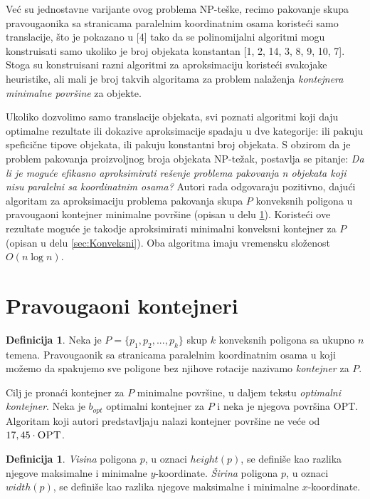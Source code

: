 \documentclass[a4paper]{article}
\theoremstyle{plain}
\theoremstyle{definition}
\newtheorem{defn}[thm]{Definicija} %
\begin{document}
Ve\'c{} su jednostavne varijante ovog problema NP-te\v{s}ke, recimo pakovanje skupa pravougaonika sa stranicama paralelnim koordinatnim osama koriste\'c{}i samo translacije, \v{s}to je pokazano u \cite{paper} [4] tako da se polinomijalni algoritmi mogu konstruisati samo ukoliko je broj objekata konstantan \cite{paper} [1, 2, 14, 3, 8, 9, 10, 7]. Stoga su konstruisani razni algoritmi za aproksimaciju koriste\'c{}i svakojake heuristike, ali mali je broj takvih algoritama za problem nala\v{z}enja \emph{kontejnera minimalne povr\v{s}ine} za objekte. 

Ukoliko dozvolimo samo translacije objekata, svi poznati algoritmi koji daju optimalne rezultate ili dokazive aproksimacije spadaju u dve kategorije: ili pakuju spefici\v{c}ne tipove objekata, ili pakuju konstantni broj objekata. S obzirom da je problem pakovanja proizvoljnog broja objekata NP-te\v{z}ak, postavlja se pitanje: \emph{Da li je mogu\'c{}e efikasno aproksimirati re\v{s}enje problema pakovanja n objekata koji nisu paralelni sa koordinatnim osama?} Autori rada odgovaraju pozitivno, daju\'c{}i algoritam za aproksimaciju problema pakovanja skupa $P$ konveksnih poligona u pravougaoni kontejner minimalne povr\v{s}ine (opisan u delu \ref{sec:Pravougaoni}). Koriste\'c{}i ove rezultate mogu\'c{}e je takodje aproksimirati minimalni konveksni kontejner za $P$ (opisan u delu \ref{sec:Konveksni}). Oba algoritma imaju vremensku slo\v{z}enost $O(n\log{}n)$.


\section{Pravougaoni kontejneri}
\label{sec:Pravougaoni}

\begin{defn}
    Neka je $P = \{ p_{1}, p_{2}, ... , p_{k} \}$ skup $k$ konveksnih poligona sa ukupno $n$ temena. Pravougaonik sa stranicama paralelnim koordinatnim osama u koji mo\v{z}emo da spakujemo sve poligone bez njihove rotacije nazivamo \emph{kontejner} za $P$.    
\end{defn}

Cilj je prona\'c{}i kontejner za $P$ minimalne povr\v{s}ine, u daljem tekstu \emph{optimalni kontejner}. Neka je $b_{opt}$ optimalni kontejner za $P$ i neka je njegova povr\v{s}ina \textsc{OPT}. Algoritam koji autori predstavljaju nalazi kontejner povr\v{s}ine ne ve\'c{}e od $17,45 \cdot \textsc{OPT}$.

\begin{defn}
    \emph{Visina} poligona $p$, u oznaci \emph{$height(p)$}, se defini\v{s}e kao razlika njegove maksimalne i minimalne $y$-koordinate. \emph{\v{S}irina} poligona $p$, u oznaci \emph{$width(p)$}, se defini\v{s}e kao razlika njegove maksimalne i minimalne $x$-koordinate.
\end{defn}
\end{document}
